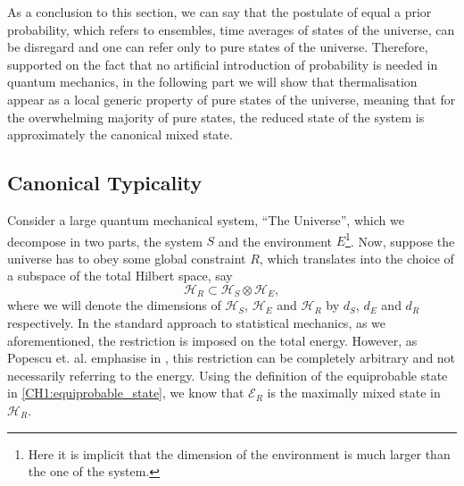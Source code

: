 \indent As a conclusion to this section, we can say that the postulate of equal a prior probability, which refers to ensembles, time averages of states of the universe, can be disregard and one can refer only to pure states of the universe. Therefore, supported on the fact that no artificial introduction of probability is needed in quantum mechanics, in the following part we will show that thermalisation appear as a local generic property of pure states of the universe, meaning that for the overwhelming majority of pure states, the reduced state of the system is approximately the canonical mixed state. 


\subsection{Canonical Typicality}


\indent Consider a large quantum mechanical system, ``The Universe'', which we decompose in two parts, the system $S$ and the environment $E$\footnote{Here it is implicit that the dimension of the environment is much larger than the one of the system.}. Now, suppose the universe has to obey some global constraint $R$, which translates into the choice of a subspace of the total Hilbert space, say
 \begin{equation}
 \mathcal{H}_{R} \subset \mathcal{H}_{S} \otimes \mathcal{H}_{E},
 \label{CH1:Tipicality_1}
 \end{equation}
\indent where we will denote the dimensions of $\mathcal{H}_{S}$, $\mathcal{H}_{E}$  and $\mathcal{H}_{R}$  by $d_S$, $d_E$ and $d_R$ respectively. In the standard approach to statistical mechanics, as we aforementioned, the restriction is imposed on the total energy. However, as Popescu et. al. emphasise in \cite{popescu_entanglement_2006, popescu_foundations_2005}, this restriction can be completely arbitrary and not necessarily referring to the energy. Using the definition of the equiprobable state in \eqref{CH1:equiprobable_state}, we know that $\mathcal{E}_R$ is the maximally mixed state in $\mathcal{H}_R$.\\

